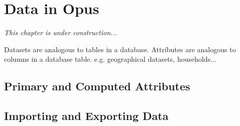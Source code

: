 \chapter{Data in Opus}
\label{chap:data-in-opus}

\emph{This chapter is under construction...}

Datasets are analogous to tables in a database. Attributes
are analogous to columns in a database table. e.g. geographical
datasets, households...

\section{Primary and Computed Attributes}

\section{Importing and Exporting Data}
